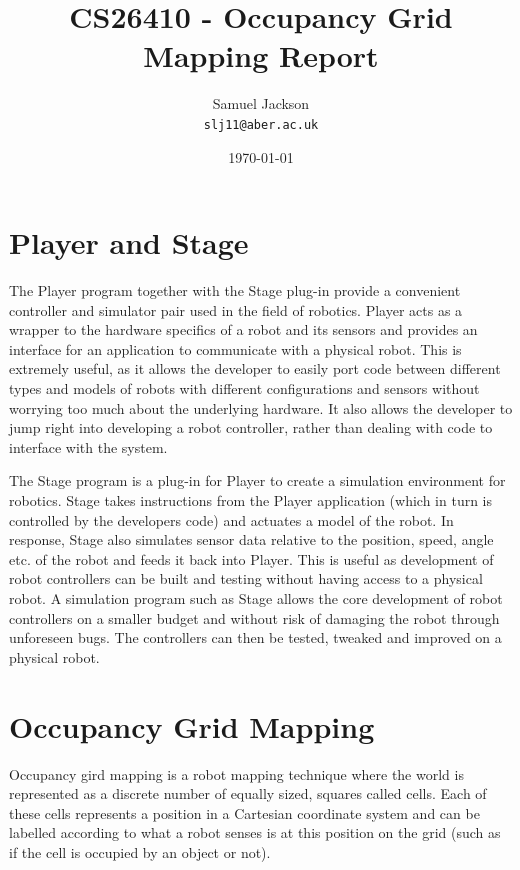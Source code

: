\documentclass{article}
\begin{document}
\title{CS26410 - Occupancy Grid Mapping Report}
\author{Samuel Jackson \\ \texttt{slj11@aber.ac.uk}}
\date{\today}
\maketitle


\section{Player and Stage}
\cite{player-stage}
The Player program together with the Stage plug-in provide a convenient controller and simulator pair used in the field of robotics. Player acts as a wrapper to the hardware specifics of a robot and its sensors and provides an interface for an application to communicate with a physical robot. This is extremely useful, as it allows the developer to easily port code between different types and models of robots with different configurations and sensors without worrying too much about the underlying hardware. It also allows the developer to jump right into developing a robot controller, rather than dealing with code to interface with the system.

The Stage program is a plug-in for Player to create a simulation environment for robotics. Stage takes instructions from the Player application (which in turn is controlled by the developers code) and actuates a model of the robot. In response, Stage also simulates sensor data relative to the position, speed, angle etc. of the robot and feeds it back into Player. This is useful as development of robot controllers can be built and testing without having access to a physical robot. A simulation program such as Stage allows the core development of robot controllers on a smaller budget and without risk of damaging the robot through unforeseen bugs. The controllers can then be tested, tweaked and improved on a physical robot.

\section{Occupancy Grid Mapping}
Occupancy gird mapping is a robot mapping technique where the world is represented as a discrete number of equally sized, squares called cells. Each of these cells represents a position in a Cartesian coordinate system and can be labelled according to what a robot senses is at this position on the grid (such as if the cell is occupied by an object or not).
\end{document}
